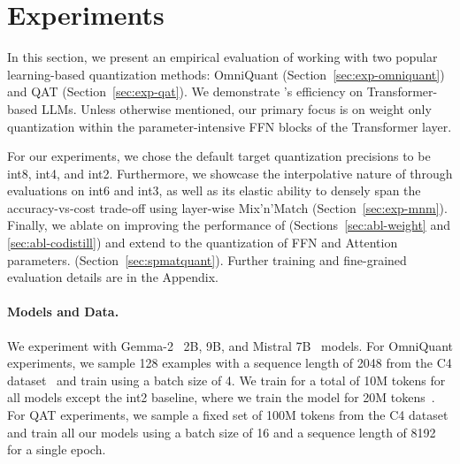 
\section{Experiments}
\label{sec:exp}
In this section, we present an empirical evaluation of \alg working with two popular learning-based quantization methods: OmniQuant (Section~\ref{sec:exp-omniquant}) and QAT (Section~\ref{sec:exp-qat}). We demonstrate \alg's efficiency on Transformer-based LLMs. Unless otherwise mentioned, our primary focus is on weight only quantization within the parameter-intensive FFN blocks of the Transformer layer.

For our experiments, we chose the default target quantization precisions to be int8, int4, and int2. Furthermore, we showcase the interpolative nature of \alg through evaluations on int6 and int3, as well as its elastic ability to densely span the accuracy-vs-cost trade-off using layer-wise Mix'n'Match (Section~\ref{sec:exp-mnm}). Finally, we ablate on improving the performance of \alg (Sections~\ref{sec:abl-weight} and \ref{sec:abl-codistill}) and extend \alg to the quantization of FFN and Attention parameters. (Section~\ref{sec:spmatquant}). 
Further training and fine-grained evaluation details are in the Appendix.

\vspace{-2mm}
\paragraph{Models and Data.} We experiment with Gemma-2~\citep{Riviere2024Gemma2I} 2B, 9B, and Mistral 7B~\citep{DBLP:mistral} models. For OmniQuant experiments, we sample 128 examples with a sequence length of 2048 from the C4 dataset~\citep{raffel2020exploring} and train using a batch size of 4. We train for a total of 10M tokens for all models except the int2 baseline, where we train the model for 20M tokens~\citep{shao2023omniquant}. For QAT experiments, we sample a fixed set of 100M tokens from the C4 dataset and train all our models using a batch size of 16 and a sequence length of 8192 for a single epoch.

